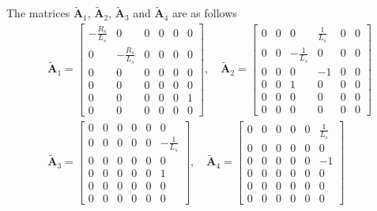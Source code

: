 \documentclass[11pt,a4paper,oneside]{book}
\numberwithin{equation}{section}
\theoremstyle{it}
\theoremstyle{definition}
\begin{document}
The matrices $\tilde{\mathbf{A}}_1$, $\tilde{\mathbf{A}}_2$, 
$\tilde{\mathbf{A}}_3$ and $\tilde{\mathbf{A}}_4$ are as follows
\begin{equation}\label{pmsm_problem_1_eq_11}
	\begin{aligned}
		&\tilde{\mathbf{A}}_1 = 
		\begin{bmatrix} 
			-\frac{R_s}{L_s} & 0 & 0 & 0 & 0 & 0 \\[6pt]			
			0 & -\frac{R_s}{L_s} & 0 & 0 & 0 & 0 \\[6pt]
			0 & 0 & 0 & 0 & 0 & 0 \\[6pt]
			0 & 0 & 0 & 0 & 0 & 0 \\[6pt]
			0 & 0 & 0 & 0 & 0 & 1 \\[6pt]
			0 & 0 & 0 & 0 & 0 & 0
		\end{bmatrix},\quad
		\tilde{\mathbf{A}}_2 = 
		\begin{bmatrix} 
			0 & 0 & 0 & \frac{1}{L_s} & 0 & 0 \\[6pt]			
			0 & 0 & -\frac{1}{L_s} & 0 & 0 & 0 \\[6pt]
			0 & 0 & 0 & -1 & 0 & 0 \\[6pt]
			0 & 0 & 1 & 0 & 0 & 0 \\[6pt]
			0 & 0 & 0 & 0 & 0 & 0 \\[6pt]
			0 & 0 & 0 & 0 & 0 & 0
		\end{bmatrix} \\[8pt]
		&\tilde{\mathbf{A}}_3 = 
		\begin{bmatrix} 
			0 & 0 & 0 & 0 & 0 & 0 \\[6pt]			
			0 & 0 & 0 & 0 & 0 & -\frac{1}{L_s} \\[6pt]
			0 & 0 & 0 & 0 & 0 & 0 \\[6pt]
			0 & 0 & 0 & 0 & 0 & 1 \\[6pt]
			0 & 0 & 0 & 0 & 0 & 0 \\[6pt]
			0 & 0 & 0 & 0 & 0 & 0
		\end{bmatrix},\quad
		\tilde{\mathbf{A}}_4 = 
		\begin{bmatrix} 
			0 & 0 & 0 & 0 & 0 & \frac{1}{L_s} \\[6pt]			
			0 & 0 & 0 & 0 & 0 & 0 \\[6pt]
			0 & 0 & 0 & 0 & 0 & -1 \\[6pt]
			0 & 0 & 0 & 0 & 0 & 0 \\[6pt]
			0 & 0 & 0 & 0 & 0 & 0 \\[6pt]
			0 & 0 & 0 & 0 & 0 & 0
		\end{bmatrix} 
	\end{aligned}
\end{equation} 
\end{document}
